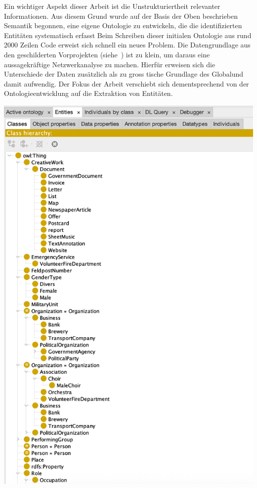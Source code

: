 \documentclass[12pt, a4paper, ngerman, bidi=default]{article}
\begin{document}
\begin{minipage}{0.48\textwidth}%
Ein wichtiger Aspekt dieser Arbeit ist die Unstrukturiertheit relevanter Informationen. 
Aus diesem Grund wurde auf der Basis der Oben beschrieben Semantik begonnen, eine eigene Ontologie zu entwickeln, die die identifizierten Entitäten systematisch erfasst\footnotemark
Beim Schreiben dieser initialen Ontologie aus rund 2000 Zeilen Code erweist sich schnell ein neues Problem. Die Datengrundlage aus den geschilderten Vorprojekten (siehe~) ist 
zu klein, um daraus eine aussagekräftige Netzwerkanalyse zu machen. Hierfür erweisen sich die Unterschiede der Daten zusätzlich als zu gross tische Grundlage des Globalund damit aufwendig. Der Fokus der Arbeit verschiebt sich dementsprechend von der Ontologieentwicklung 
auf die Extraktion von Entitäten.
\end{minipage}%
\hfill%
\begin{minipage}{0.48\textwidth}%
  \centering
  \includegraphics[width=\linewidth]{assets/Images/Bildschirmfoto_ttl_ontologie_Ausschnitt.png}
  \label{fig:ttl-ontologie}
\end{minipage}
\end{document}
